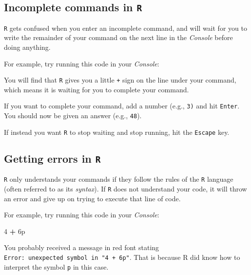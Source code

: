 \documentclass[
]{book}
\newenvironment{Shaded}{\begin{snugshade}}{\end{snugshade}}
\newcommand{\DecValTok}[1]{\textcolor[rgb]{0.00,0.00,0.81}{#1}}
\newcommand{\NormalTok}[1]{#1}
\newcommand{\OperatorTok}[1]{\textcolor[rgb]{0.81,0.36,0.00}{\textbf{#1}}}
\newcommand{\StringTok}[1]{\textcolor[rgb]{0.31,0.60,0.02}{#1}}
\begin{document}
\hypertarget{incomplete-commands-in-r}{%
\subsection*{\texorpdfstring{Incomplete commands in \texttt{R}}{Incomplete commands in R}}\label{incomplete-commands-in-r}}

\texttt{R} gets confused when you enter an incomplete command, and will wait for you to write the remainder of your command on the next line in the \emph{Console} before doing anything.

For example, try running this code in your \emph{Console}:

You will find that \texttt{R} gives you a little \texttt{+} sign on the line under your command, which means it is waiting for you to complete your command.

If you want to complete your command, add a number (e.g., \texttt{3)} and hit \texttt{Enter}. You should now be given an answer (e.g., \texttt{48}).

If instead you want \texttt{R} to stop waiting and stop running, hit the \texttt{Escape} key.

\hypertarget{getting-errors-in-r}{%
\subsection*{\texorpdfstring{Getting errors in \texttt{R}}{Getting errors in R}}\label{getting-errors-in-r}}

\texttt{R} only understands your commands if they follow the rules of the \texttt{R} language (often referred to as its \emph{syntax}). If \texttt{R} does not understand your code, it will throw an error and give up on trying to execute that line of code.

For example, try running this code in your \emph{Console}:

\begin{Shaded}
\begin{Highlighting}[]
\DecValTok{4} \OperatorTok{+}\StringTok{ }\NormalTok{6p}
\end{Highlighting}
\end{Shaded}

You probably received a message in red font stating \texttt{Error:\ unexpected\ symbol\ in\ "4\ +\ 6p"}. That is because R did know how to interpret the symbol \texttt{p} in this case.
\end{document}
